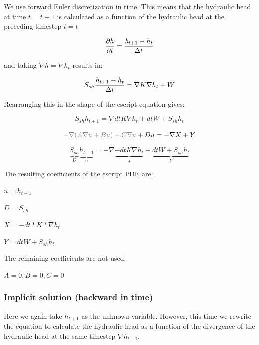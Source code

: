 \documentclass[11pt]{article}
\begin{document}
We use forward Euler discretization in time. This means that the hydraulic head at time $t = t+1$ is calculated as a function of the hydraulic head at the preceding timestep $t = t$

\begin{equation}
    {\partial h \over{\partial t}} = {h_{t+1} - h_t \over{\Delta t}} 
\end{equation}

and taking $\nabla h = \nabla h_t $ results in:

\begin{equation}
   S_{sh} {h_{t+1} - h_t \over{\Delta t}} = \nabla K  \nabla h_t + W
\end{equation}

Rearranging this in the shape of the escript equation gives:

\begin{equation}
   S_{sh} h_{t+1} =  \nabla dt K \nabla h_t + dt W + S_{sh} h_t 
\end{equation}

\begin{equation}
   {\color{gray} - \nabla (A \nabla u + B u ) + C \nabla u} + D u = - \nabla X + Y
\end{equation}

\begin{equation}
   \underbrace{S_{sh}}_D \underbrace{h_{t+1}}_u = - \nabla \underbrace{-dt K \nabla h_t}_X + \underbrace{dt W + S_{sh} h_t}_Y 
\end{equation}

The resulting coefficients of the escript PDE are:

$u = h_{t+1}$

$ D = S_{sh} $

$ X = - dt * K * \nabla h_t$

$ Y = dt W + S_{sh} h_t $

The remaining coefficients are not used:

$ A=0 , B = 0 , C = 0 $


\subsubsection{Implicit solution (backward in time)}

Here we again take $h_{t+1}$ as the unknown variable. However, this time we rewrite the equation to calculate the hydraulic head as a function of the divergence of the hydraulic head at the same timestep $\nabla h_{t+1}$. 
\end{document}
